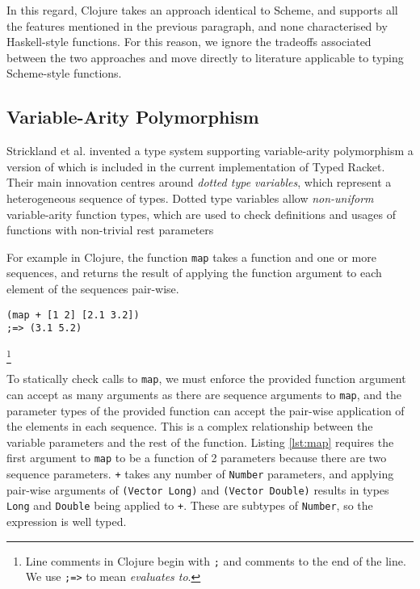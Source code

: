 In this regard, Clojure takes an approach identical to Scheme, and supports all the features
mentioned in the previous paragraph, and none characterised by Haskell-style functions.
For this reason, we ignore the tradeoffs associated between the two approaches 
and move directly to literature applicable to typing Scheme-style functions.

\subsection{Variable-Arity Polymorphism}

Strickland et al. invented a type system supporting variable-arity polymorphism\cite{STF09}
a version of which is included in the current implementation of Typed Racket.
Their main innovation centres around \emph{dotted type variables}, which represent a heterogeneous sequence
of types. Dotted type variables allow \emph{non-uniform} variable-arity function types,
which are used to check definitions and usages of functions with non-trivial rest parameters

For example in Clojure, the function \lstinline|map| takes a function and one or more sequences,
and returns the result of applying the function argument to each element of the sequences pair-wise.

\begin{lstlisting}[caption=An application of the non-uniform variable-arity function \lstinline|map|, label=lst:map]
(map + [1 2] [2.1 3.2]) 
;=> (3.1 5.2)
\end{lstlisting}\footnote{Line comments in Clojure begin with \lstinline|;| and comments to the end of the line. We use \lstinline|;=>| to mean \emph{evaluates to}.}

To statically check calls to \lstinline|map|, we must enforce the provided function argument can accept as many
arguments as there are sequence arguments to \lstinline|map|, and the parameter types of the provided function can accept
the pair-wise application of the elements in each sequence. This is a complex relationship between the variable parameters and
the rest of the function.
Listing \ref{lst:map} requires the first argument to \lstinline|map| to be a function of 2 parameters because
there are two sequence parameters. \lstinline|+| takes any number of \lstinline|Number| parameters, 
and applying pair-wise arguments of \lstinline|(Vector Long)| and \lstinline|(Vector Double)| 
results in types \lstinline|Long| and \lstinline|Double| being applied to \lstinline|+|. These are subtypes
of \lstinline|Number|, so the expression is well typed.

